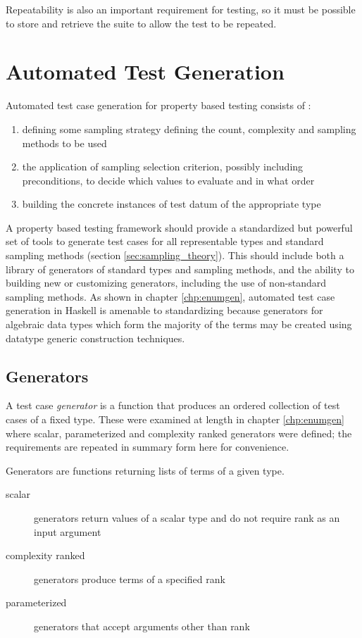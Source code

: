 Repeatability is also an important requirement for testing,
so it must be possible to store and retrieve the suite to allow the test to be repeated.


\section{Automated Test Generation} \label{reqtestgen}

Automated test case generation for property based testing consists of :

\begin{enumerate}
    \item defining some sampling strategy defining the count, complexity and sampling methods to be used
    \item the application of sampling selection criterion, possibly including preconditions, to decide which values to evaluate and in what order
    \item building the concrete instances of test datum of the appropriate type
\end{enumerate}

A property based testing framework should provide a
standardized but powerful set of tools to generate test cases
for all representable types and standard sampling methods (section \ref{sec:sampling_theory}).
This should include both a library of generators of standard types and sampling methods,
and the ability to building new or customizing generators,
including the use of non-standard sampling methods.
As shown in chapter \ref{chp:enumgen}, 
automated test case generation in Haskell is amenable to standardizing
because generators for algebraic data types which form the majority of the terms
may be created using datatype generic construction techniques.

\subsection{Generators}

A test case \emph{generator} is a function that produces an ordered collection of test cases of a fixed type.
These were examined at length in chapter \ref{chp:enumgen}
where scalar, parameterized and complexity ranked generators were defined;
the requirements are repeated in summary form here for convenience.

Generators are functions returning lists of terms of a given type.
\begin{description}
    \item[scalar] generators return values of a scalar type and do not require rank as an input argument
    \item[complexity ranked] generators produce terms of a specified rank
    \item[parameterized] generators that accept arguments other than rank
\end{description}


